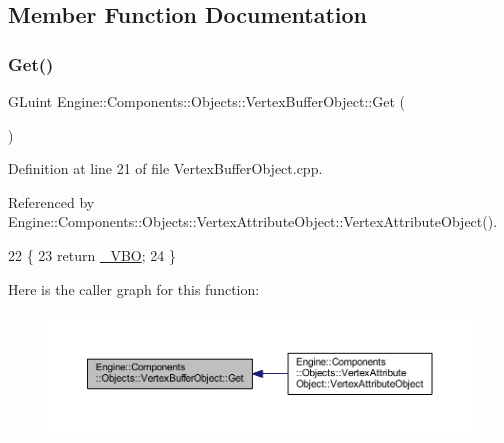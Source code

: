 \subsection{Member Function Documentation}
\mbox{\label{classEngine_1_1Components_1_1Objects_1_1VertexBufferObject_abf4805d63271ee1c56a15214cd75077d}} 
\subsubsection{\texorpdfstring{Get()}{Get()}}
{\footnotesize\ttfamily G\+Luint Engine\+::\+Components\+::\+Objects\+::\+Vertex\+Buffer\+Object\+::\+Get (\begin{DoxyParamCaption}{ }\end{DoxyParamCaption})}



Definition at line 21 of file Vertex\+Buffer\+Object.\+cpp.



Referenced by Engine\+::\+Components\+::\+Objects\+::\+Vertex\+Attribute\+Object\+::\+Vertex\+Attribute\+Object().


\begin{DoxyCode}
22 \{
23     \textcolor{keywordflow}{return} \mbox{\hyperlink{classEngine_1_1Components_1_1Objects_1_1VertexBufferObject_a0014c1ab3ceb3c3437003057638b279f}{\_VBO}};
24 \}
\end{DoxyCode}
Here is the caller graph for this function\+:
\nopagebreak
\begin{figure}[H]
\begin{center}
\leavevmode
\includegraphics[width=350pt]{classEngine_1_1Components_1_1Objects_1_1VertexBufferObject_abf4805d63271ee1c56a15214cd75077d_icgraph}
\end{center}
\end{figure}
\mbox{\label{classEngine_1_1Components_1_1Objects_1_1VertexBufferObject_ada22635c60245448346653b0e82f5d9c}} 
